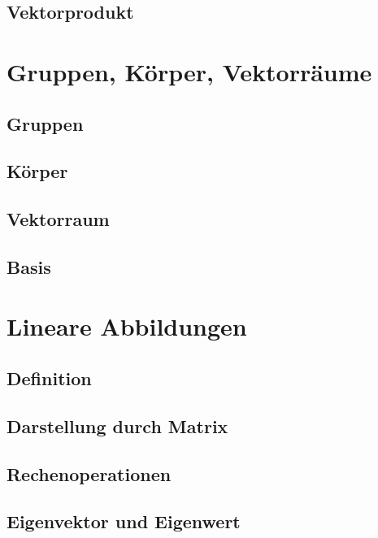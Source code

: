 \documentclass[a4paper,10pt]{scrartcl}
\begin{document}
        \subsection{Vektorprodukt}
    
    \section{Gruppen, Körper, Vektorräume}
        \subsection{Gruppen}
        \subsection{Körper}
        \subsection{Vektorraum}
        \subsection{Basis}

    \section{Lineare Abbildungen}
        \subsection{Definition}
        \subsection{Darstellung durch Matrix}
        \subsection{Rechenoperationen}
        \subsection{Eigenvektor und Eigenwert}
    
\end{document}
